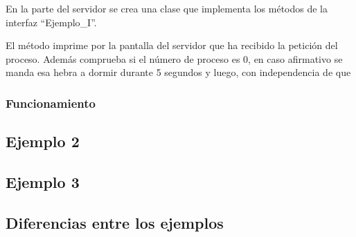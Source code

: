 \documentclass{article}
\begin{document}
En la parte del servidor se crea una clase que implementa los métodos de la interfaz ``Ejemplo\_I''.

El método imprime por la pantalla del servidor que ha recibido la petición del proceso. Además comprueba si el número de proceso es 0, en caso afirmativo se manda esa hebra a dormir durante 5 segundos y luego, con independencia de que 


\subsubsection{Funcionamiento}


\subsection{Ejemplo 2}

\subsection{Ejemplo 3}

\subsection{Diferencias entre los ejemplos}
\end{document}
